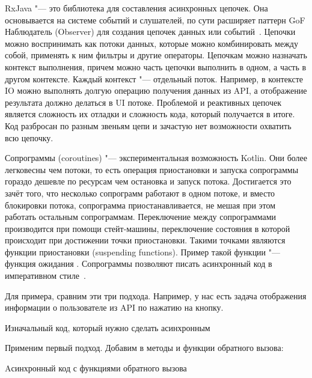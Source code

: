 RxJava "--- это библиотека для составления асинхронных цепочек.
Она основывается на системе событий и слушателей, по сути расширяет паттерн GoF Наблюдатель (Observer) для создания цепочек данных или событий~\cite{reactivex}.
Цепочки можно воспринимать как потоки данных, которые можно комбинировать между собой, применять к ним фильтры и другие операторы.
Цепочкам можно назначать контекст выполнения, причем можно часть цепочки выполнить в одном, а часть в другом контексте.
Каждый контекст "--- отдельный поток.
Например, в контексте IO можно выполнять долгую операцию получения данных из API, а отображение результата должно делаться в UI потоке.
Проблемой и реактивных цепочек является сложность их отладки и сложность кода, который получается в итоге.
Код разбросан по разным звеньям цепи и зачастую нет возможности охватить всю цепочку.


Сопрограммы (coroutines) "--- экспериментальная возможность Kotlin.
Они более легковесны чем потоки, то есть операция приостановки и запуска сопрограммы гораздо дешевле по ресурсам чем остановка и запуск потока.
Достигается это зачёт того, что несколько сопрограмм работают в одном потоке, и вместо блокировки потока, сопрограмма приостанавливается, не мешая при этом работать остальным сопрограммам.
Переключение между сопрограммами производится при помощи стейт-машины, переключение состояния в которой происходит при достижении точки приостановки.
Такими точками являются функции приостановки (suspending functions).
Пример такой функции "--- функция ожидания .
Сопрограммы позволяют писать асинхронный код в императивном стиле~\cite{github:coroutines}.

Для примера, сравним эти три подхода.
Например, у нас есть задача отображения информации о пользователе из API по нажатию на кнопку.

\begin{listing}[H]
  \caption{Изначальный код, который нужно сделать асинхронным}
  \label{lst:asyncKtSrc}
\end{listing}

Применим первый подход.
Добавим в методы  и  функции обратного вызова:

\begin{listing}[H]
  \caption{Aсинхронный код с функциями обратного вызова}
  \label{lst:asyncKtCallbacks}
\end{listing}

